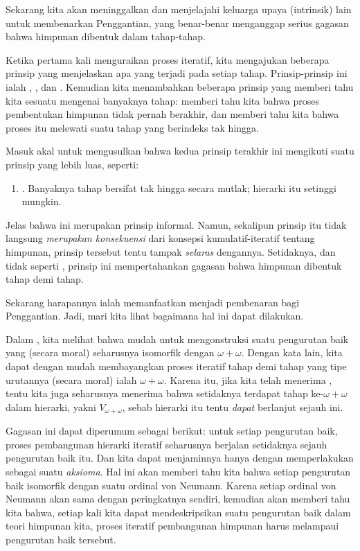 \documentclass[../../../include/open-logic-section]{subfiles}
\begin{document}

Sekarang kita akan meninggalkan \limofsize{} dan menjelajahi keluarga upaya
(intrinsik) lain untuk membenarkan Penggantian, yang benar-benar menganggap
serius gagasan bahwa himpunan dibentuk dalam tahap-tahap.

Ketika pertama kali menguraikan proses iteratif, kita mengajukan beberapa
prinsip yang menjelaskan apa yang terjadi pada setiap tahap. Prinsip-prinsip
ini ialah \stageshier, \stagesord, dan \stagesacc. Kemudian kita menambahkan
beberapa prinsip yang memberi tahu kita sesuatu mengenai banyaknya tahap:
\stagessucc{} memberi tahu kita bahwa proses pembentukan himpunan tidak
pernah berakhir, dan \stagesinf{} memberi tahu kita bahwa proses itu melewati
suatu tahap yang berindeks tak hingga.

Masuk akal untuk mengusulkan bahwa kedua prinsip terakhir ini mengikuti
suatu prinsip yang lebih luas, seperti:
\begin{enumerate}
	\item[] \stagesinex. Banyaknya tahap bersifat tak hingga secara mutlak;
	hierarki itu setinggi mungkin.
\end{enumerate}
Jelas bahwa ini merupakan prinsip informal. Namun, sekalipun prinsip itu
tidak langsung \emph{merupakan konsekuensi} dari konsepsi kumulatif-iteratif tentang
himpunan, prinsip tersebut tentu tampak \emph{selaras} dengannya. Setidaknya,
dan tidak seperti \limofsize, prinsip ini mempertahankan gagasan bahwa
himpunan dibentuk tahap demi tahap.

Sekarang harapannya ialah memanfaatkan \stagesinex{} menjadi pembenaran bagi
Penggantian. Jadi, mari kita lihat bagaimana hal ini dapat dilakukan.

Dalam , kita melihat bahwa mudah untuk
mengonstruksi suatu pengurutan baik yang (secara moral) seharusnya isomorfik
dengan $\omega+\omega$. Dengan kata lain, kita dapat dengan mudah
membayangkan proses iteratif tahap demi tahap yang tipe urutannya (secara
moral) ialah $\omega+\omega$. Karena itu, jika kita telah menerima
\stagesinex, tentu kita juga seharusnya menerima bahwa setidaknya terdapat
tahap ke-$\omega+\omega$ dalam hierarki, yakni $V_{\omega+\omega}$, sebab
hierarki itu tentu \emph{dapat} berlanjut sejauh ini.

Gagasan ini dapat diperumum sebagai berikut: untuk setiap pengurutan baik,
proses pembangunan hierarki iteratif seharusnya berjalan setidaknya sejauh
pengurutan baik itu. Dan kita dapat menjaminnya hanya dengan memperlakukan
 sebagai suatu
\emph{aksioma}. Hal ini akan memberi tahu kita bahwa setiap pengurutan baik
isomorfik dengan suatu ordinal von Neumann. Karena setiap ordinal von Neumann
akan sama dengan peringkatnya sendiri,
 kemudian akan memberi
tahu kita bahwa, setiap kali kita dapat mendeskripsikan suatu pengurutan baik
dalam teori himpunan kita, proses iteratif pembangunan himpunan harus
melampaui pengurutan baik tersebut.
\end{document}
